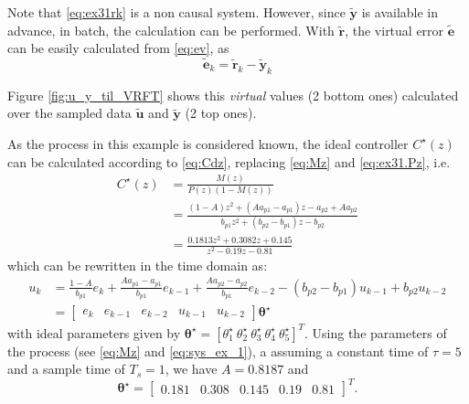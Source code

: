 \begin{exmp}
   Note that \eqref{eq:ex31rk} is a non causal system.
   However, since $\tilde{\bm{y}}$ is available in advance, in batch, the calculation can be performed.
   With $\tilde{\bm{r}}$, the virtual error $\tilde{\bm{e}}$ can be easily calculated from \eqref{eq:ev}, as
   \begin{equation*}
      \tilde{\bm{e}}_k = \tilde{\bm{r}}_k - \tilde{\bm{y}}_k 
   \end{equation*}

   Figure \ref{fig:u_y_til_VRFT} shows this \textit{virtual} values (2 bottom ones) calculated over the sampled data $\tilde{\bm{u}}$ and $\tilde{\bm{y}}$ (2 top ones).

   As the process in this example is considered known, the ideal controller $C^\star(z)$ can be calculated according to \eqref{eq:Cdz}, replacing \eqref{eq:Mz} and \eqref{eq:ex31.Pz}, i.e.
   \begin{align}
      C^\star(z) &= \frac{M(z)}{P(z)\left(1-M(z)\right)} \\
             &= \frac{(1 - A)z^2 + (Aa_{p1} - a_{p1})z - a_{p2} + Aa_{p2}}{b_{p1}z^2 + (b_{p2} - b_{p1})z - b_{p2}} \\
             &= \frac{0.1813 z^2 + 0.3082 z + 0.145}{ z^2 - 0.19 z - 0.81}
   \end{align}
   which can be rewritten in the time domain as:
   \begin{align}
      \label{eq:exp31_uk}
      u_k &= \frac{1 - A}{b_{p1}}e_k + \frac{Aa_{p1} - a_{p1}}{b_{p1}}e_{k-1} + \frac{Aa_{p2} - a_{p2}}{b_{p1}}e_{k-2} - (b_{p2} - b_{p1})u_{k-1} + b_{p2}u_{k-2} \nonumber\\
          &=\begin{bmatrix} e_k & e_{k-1} & e_{k-2} & u_{k-1} & u_{k-2} \end{bmatrix}  \bm{\theta}^\star
   \end{align}
   with ideal parameters given by $\bm{\theta}^\star = [\theta^\star_1 \ \theta^\star_2 \ \theta^\star_3 \ \theta^\star_4 \ \theta^\star_5]^T$. Using the parameters of the process (see \eqref{eq:Mz} and \eqref{eq:sys_ex_1}), a assuming a constant time of $\tau=5$ and a sample time of $T_s=1$, we have $A= 0.8187$ and 
   \begin{equation}
      \bm{\theta}^{\star}= \begin{bmatrix}   0.181 & 0.308 &  0.145 &  0.19 & 0.81 \end{bmatrix}^T.
      \label{eq:exp31_ideal_parameters}
   \end{equation}


\end{exmp}
